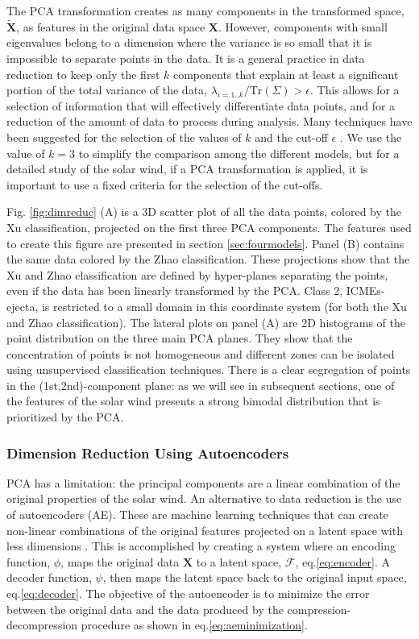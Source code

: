 \documentclass[utf8]{frontiersSCNS} %
\begin{document}
The PCA transformation creates as many components in the transformed space, $\boldsymbol{\tilde{X}}$, as features in the original data space $\boldsymbol{X}$. However, components with small eigenvalues belong to a dimension where the variance is so small that it is impossible to separate points in the data. It is a general practice in data reduction to keep only the first $k$ components that explain at least a significant portion of the total variance of the data, $\lambda_{i=1..k}/\text{Tr}(\Sigma) > \epsilon$. This allows for a selection of information that will effectively differentiate data points, and for a reduction of the amount of data to process during analysis. Many techniques have been suggested for the selection of the values of $k$ and the cut-off $\epsilon$ \citep{Rea2016}. We use the value of $k=3$ to simplify the comparison among the different models, but for a detailed study of the solar wind, if a PCA transformation is applied, it is important to use a fixed criteria for the selection of the cut-offs.

Fig. \ref{fig:dimreduc} (A) is a 3D scatter plot of all the data points, colored by the Xu classification, projected on the first three PCA components. The features used to create this figure are presented in section \ref{sec:fourmodels}. Panel (B) contains the same data colored by the Zhao classification. These projections show that the Xu and Zhao classification are defined by hyper-planes separating the points, even if the data has been linearly transformed by the PCA. Class 2, ICMEs-ejecta, is restricted to a small domain in this coordinate system (for both the Xu and Zhao classification). The lateral plots on panel (A) are 2D histograms of the point distribution on the three main PCA planes. They show that the concentration of points is not homogeneous and different zones can be isolated using unsupervised classification techniques. There is a clear segregation of points in the (1st,2nd)-component plane: as we will see in subsequent sections, one of the features of the solar wind presents a strong bimodal distribution that is prioritized by the PCA.

\subsubsection{Dimension Reduction Using Autoencoders}
\label{sec:reducae}
PCA has a limitation: the principal components are a linear combination of the original properties of the solar wind. An alternative to data reduction is the use of autoencoders (AE). These are machine learning techniques that can create non-linear combinations of the original features projected on a latent space with less dimensions \citep{Hinton2006}. This is accomplished by creating a system where an encoding function, $\phi$, maps the original data $\boldsymbol{X}$ to a latent space, $\boldsymbol{\mathcal{F}}$, eq.\eqref{eq:encoder}. A decoder function, $\psi$, then maps the latent space back to the original input space, eq.\eqref{eq:decoder}. The objective of the autoencoder is to minimize the error between the original data and the data produced by the compression-decompression procedure as shown in eq.\eqref{eq:aeminimization}.
\end{document}
